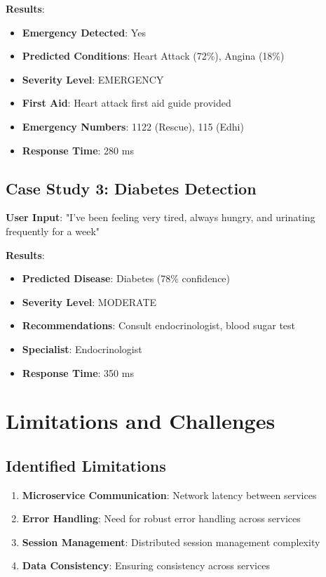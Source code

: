 \documentclass[12pt,a4paper]{article}
\begin{document}
\textbf{Results}:
\begin{itemize}
    \item \textbf{Emergency Detected}: Yes
    \item \textbf{Predicted Conditions}: Heart Attack (72\%), Angina (18\%)
    \item \textbf{Severity Level}: EMERGENCY
    \item \textbf{First Aid}: Heart attack first aid guide provided
    \item \textbf{Emergency Numbers}: 1122 (Rescue), 115 (Edhi)
    \item \textbf{Response Time}: 280 ms
\end{itemize}

\subsection{Case Study 3: Diabetes Detection}
\textbf{User Input}: "I've been feeling very tired, always hungry, and urinating frequently for a week"

\textbf{Results}:
\begin{itemize}
    \item \textbf{Predicted Disease}: Diabetes (78\% confidence)
    \item \textbf{Severity Level}: MODERATE
    \item \textbf{Recommendations}: Consult endocrinologist, blood sugar test
    \item \textbf{Specialist}: Endocrinologist
    \item \textbf{Response Time}: 350 ms
\end{itemize}

\section{Limitations and Challenges}
\subsection{Identified Limitations}
\begin{enumerate}
    \item \textbf{Microservice Communication}: Network latency between services
    \item \textbf{Error Handling}: Need for robust error handling across services
    \item \textbf{Session Management}: Distributed session management complexity
    \item \textbf{Data Consistency}: Ensuring consistency across services
\end{enumerate}
\end{document}
